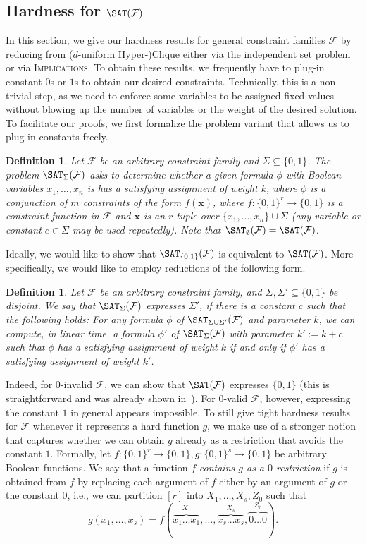 \documentclass[10pt,a4paper]{article}
\theoremstyle{plain}
\newtheorem{defn}[thm]{Definition}
\newcommand{\confam}{\mathcal{F}}
\newcommand{\Implication}{\textsc{Implications}\xspace}
\newcommand{\entry}[1]{#1 \dots #1}
\begin{document}
\subsection{Hardness for $\SAT(\confam)$}
%
In this section, we give our hardness results for general constraint families $\confam$ by reducing from ($d$-uniform Hyper-)Clique either via the independent set problem or via \Implication.
%
To obtain these results, we frequently have to plug-in constant $0$s or $1$s to obtain our desired constraints. Technically, this is a non-trivial step, as we need to enforce some variables to be assigned fixed values without blowing up the number of variables or the weight of the desired solution. To facilitate our proofs, we first formalize the problem variant that allows us to plug-in constants freely.
\begin{defn}
Let $\confam$ be an arbitrary constraint family and $\Sigma\subseteq \{0,1\}$. The problem $\SAT_\Sigma(\confam)$ asks to determine whether a given formula $\phi$ with Boolean variables $x_1,\dots, x_n$ is has a satisfying assignment of weight $k$, where $\phi$ is a conjunction of $m$ constraints of the form $f(\mathbf{x})$, where $f:\{0,1\}^r \to \{0,1\}$ is a constraint function in $\confam$ and $\mathbf{x}$ is an $r$-tuple over $\{x_1,\dots, x_n\} \cup \Sigma$ (any variable or constant $c\in \Sigma$ may be used repeatedly). Note that $\SAT_\emptyset(\confam) = \SAT(\confam)$.
\end{defn}
%
Ideally, we would like to show that $\SAT_{\{0,1\}}(\confam)$ is equivalent to $\SAT(\confam)$. More specifically, we would like to employ reductions of the following form. 
\begin{defn}
Let $\confam$ be an arbitrary constraint family, and $\Sigma,\Sigma' \subseteq \{0,1\}$ be disjoint. We say that $\SAT_\Sigma(\confam)$ \emph{expresses} $\Sigma'$, if there is a constant $c$ such that the following holds: For any formula $\phi$ of $\SAT_{\Sigma\cup \Sigma'}(\confam)$ and parameter $k$, we can compute, in linear time, a formula $\phi'$ of $\SAT_\Sigma(\confam)$ with parameter $k':= k + c$ such that $\phi$ has a satisfying assignment of weight $k$ if and only if $\phi'$ has a satisfying assignment of weight $k'$.
\end{defn}
%
Indeed, for $0$-invalid $\confam$, we can show that $\SAT(\confam)$ expresses $\{0,1\}$ (this is straightforward and was already shown in~\cite{Marx05}). For $0$-valid $\confam$, however, expressing the constant $1$ in general appears impossible. To still give tight hardness results for $\confam$ whenever it represents a hard function $g$, we make use of a stronger notion that captures whether we can obtain $g$ already as a restriction that avoids the constant $1$.
Formally, let $f:\{0,1\}^r \to \{0,1\}, g:\{0,1\}^s\to \{0,1\}$ be arbitrary Boolean functions. We say that a function $f$ \emph{contains $g$ as a $0$-restriction} if $g$ is obtained from $f$ by replacing each argument of $f$ either by an argument of $g$ or the constant $0$, i.e., we can partition $[r]$ into $X_1,\dots, X_s, Z_0$ such that 
\[ g(x_1,\dots,x_s) = f(\overbrace{\entry{x_1}}^{X_1}, \dots, \overbrace{\entry{x_s}}^{X_s}, \overbrace{\entry{0}}^{Z_0}).\]
%
  
\end{document}
